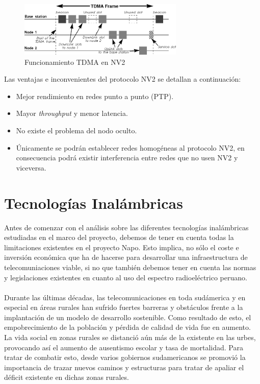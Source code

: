 		\begin{figure}[H]
			\centering
			\includegraphics[width=0.7\textwidth]{img/TDMA.png}
			\caption{Funcionamiento TDMA en NV2}
			\label{NV2}
		\end{figure}
		
		Las ventajas e inconvenientes del protocolo NV2 se detallan a continuación:
		\begin{itemize}
			\item Mejor rendimiento en redes punto a punto (PTP).
			\item Mayor \textit{throughput} y menor latencia.
			\item No existe el problema del nodo oculto.
			\item Únicamente se podrán establecer redes homogéneas al protocolo NV2, en consecuencia podrá existir interferencia entre redes que no usen NV2 y viceversa.
		\end{itemize}
		
\section{Tecnologías Inalámbricas}
Antes de comenzar con el análisis sobre las diferentes tecnologías inalámbricas estudiadas en el marco del proyecto,  debemos de tener en cuenta todas la limitaciones existentes en el proyecto Napo. Esto implica, no sólo el coste e inversión económica que ha de hacerse para desarrollar una infraestructura de telecomuniaciones viable, si no que también debemos tener en cuenta las normas y legislaciones existentes en cuanto al uso del espectro radioeléctrico peruano.\\\\

Durante las últimas décadas, las telecomunicaciones en toda sudámerica y en especial en áreas rurales han sufrido fuertes barreras y obstáculos frente a la implantación de un modelo de desarrollo sostenible. Como resultado de esto, el empobrecimiento de la población y pérdida de calidad de vida fue en aumento. La vida social en zonas rurales se distanció aún más de la existente en las urbes, provocando así el aumento de ausentismo escolar y tasa de mortalidad. Para tratar de combatir esto, desde varios gobiernos sudamericanos se promovió la importancia de trazar nuevos caminos y estructuras para tratar de apaliar el déficit existente en dichas zonas rurales.\\\\

